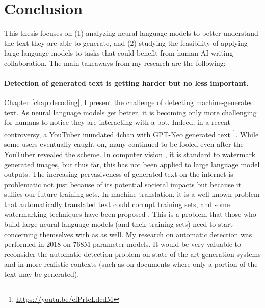 \chapter{Conclusion}

This thesis focuses on (1) analyzing neural language models to better understand the text they are able to generate, and (2) studying the feasibility of applying large language models to tasks that could benefit from human-AI writing collaboration.
The main takeaways from my research are the following:

\subsubsection{Detection of generated text is getting harder but no less important.}
	Chapter \ref{chap:decoding}, I present the challenge of detecting machine-generated text.
	As neural language models get better, it is becoming only more challenging for humans to notice they are interacting with a bot.
	Indeed, in a recent controversy, a YouTuber inundated 4chan with GPT-Neo generated text \footnote{\url{https://youtu.be/efPrtcLdcdM}}.
	While some users eventually caught on, many continued to be fooled even after the YouTuber revealed the scheme.
	In computer vision \citep{saharia2022photorealistic,ramesh2022hierarchical}, it is standard to watermark generated images, but thus far, this has not been applied to large language model outputs.
	The increasing pervasiveness of generated text on the internet is problematic not just because of its potential societal impacts but because it sullies our future training sets.
	In machine translation, it is a well-known problem that automatically translated text could corrupt training sets, and some watermarking techniques have been proposed \citep{venugopal2011watermarking}.
	This is a problem that those who build large neural language models (and their training sets) need to start concerning themselves with as as well.
	My research on automatic detection was performed in 2018 on 768M parameter models.
	It would be very valuable to reconsider the automatic detection problem on state-of-the-art generation systems and in more realistic contexts (such as on documents where only a portion of the text may be generated).

